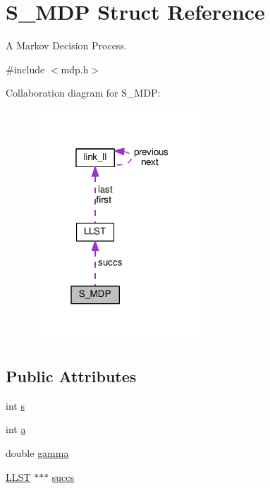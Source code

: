 \hypertarget{structS__MDP}{}\section{S\+\_\+\+M\+DP Struct Reference}
\label{structS__MDP}


A Markov Decision Process.  




{\ttfamily \#include $<$mdp.\+h$>$}



Collaboration diagram for S\+\_\+\+M\+DP\+:\nopagebreak
\begin{figure}[H]
\begin{center}
\leavevmode
\includegraphics[width=184pt]{structS__MDP__coll__graph}
\end{center}
\end{figure}
\subsection*{Public Attributes}
\begin{DoxyCompactItemize}
\item 
int \hyperlink{structS__MDP_af679a2da7c40a40f980830cc2cbf6b77}{s}
\item 
int \hyperlink{structS__MDP_a512f18c9bed22b8a7e14be6e721499ec}{a}
\item 
double \hyperlink{structS__MDP_a973affe2889f433250f47b659609f100}{gamma}
\item 
\hyperlink{structLLST}{L\+L\+ST} $\ast$$\ast$$\ast$ \hyperlink{structS__MDP_abe58c0d8bf2759da0306273d7837f7a8}{succs}
\end{DoxyCompactItemize}


